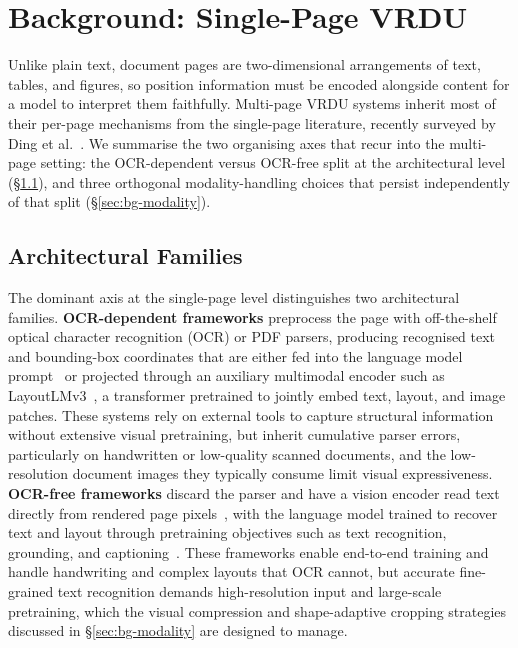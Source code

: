 \documentclass[11pt]{article}
\begin{document}
\section{Background: Single-Page VRDU}
\label{sec:background}

Unlike plain text, document pages are two-dimensional arrangements of text, tables, and figures, so position information must be encoded alongside content for a model to interpret them faithfully. Multi-page VRDU systems inherit most of their per-page mechanisms from the single-page literature, recently surveyed by Ding et al.~\cite{ding2025survey}. We summarise the two organising axes that recur into the multi-page setting: the OCR-dependent versus OCR-free split at the architectural level (\S\ref{sec:bg-architecture}), and three orthogonal modality-handling choices that persist independently of that split (\S\ref{sec:bg-modality}).

\subsection{Architectural Families}
\label{sec:bg-architecture}

The dominant axis at the single-page level distinguishes two architectural families. \textbf{OCR-dependent frameworks} preprocess the page with off-the-shelf optical character recognition (OCR) or PDF parsers, producing recognised text and bounding-box coordinates that are either fed into the language model prompt~\cite{wang2024docllm} or projected through an auxiliary multimodal encoder such as LayoutLMv3~\cite{huang2022layoutlmv3,luo2024layoutllm}, a transformer pretrained to jointly embed text, layout, and image patches. These systems rely on external tools to capture structural information without extensive visual pretraining, but inherit cumulative parser errors, particularly on handwritten or low-quality scanned documents, and the low-resolution document images they typically consume limit visual expressiveness. \textbf{OCR-free frameworks} discard the parser and have a vision encoder read text directly from rendered page pixels~\cite{hu2024mplugdocowl}, with the language model trained to recover text and layout through pretraining objectives such as text recognition, grounding, and captioning~\cite{wang2023towards}. These frameworks enable end-to-end training and handle handwriting and complex layouts that OCR cannot, but accurate fine-grained text recognition demands high-resolution input and large-scale pretraining, which the visual compression and shape-adaptive cropping strategies discussed in \S\ref{sec:bg-modality} are designed to manage.
\end{document}
